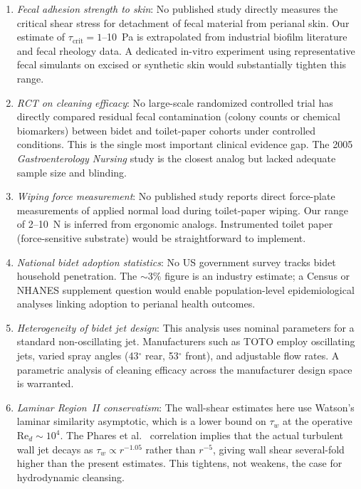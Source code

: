\documentclass[10pt,letterpaper]{article}
\newcommand{\Rey}{\mathrm{Re}}
\begin{document}
\begin{enumerate}[leftmargin=*, label=(\roman*)]
    \item \emph{Fecal adhesion strength to skin}: No published study directly
    measures the critical shear stress for detachment of fecal material from
    perianal skin. Our estimate of $\tau_\mathrm{crit} = 1$--10~Pa is
    extrapolated from industrial biofilm literature and fecal rheology data.
    A dedicated in-vitro experiment using representative fecal simulants on
    excised or synthetic skin would substantially tighten this range.
    \item \emph{RCT on cleaning efficacy}: No large-scale randomized
    controlled trial has directly compared residual fecal contamination
    (colony counts or chemical biomarkers) between bidet and toilet-paper
    cohorts under controlled conditions. This is the single most important
    clinical evidence gap. The 2005 \textit{Gastroenterology Nursing} study
    is the closest analog but lacked adequate sample size and blinding.
    \item \emph{Wiping force measurement}: No published study reports direct
    force-plate measurements of applied normal load during toilet-paper wiping.
    Our range of 2--10~N is inferred from ergonomic analogs. Instrumented
    toilet paper (force-sensitive substrate) would be straightforward to
    implement.
    \item \emph{National bidet adoption statistics}: No US government survey
    tracks bidet household penetration. The $\sim3\%$ figure is an industry
    estimate; a Census or NHANES supplement question would enable population-level
    epidemiological analyses linking adoption to perianal health outcomes.
    \item \emph{Heterogeneity of bidet jet design}: This analysis uses
    nominal parameters for a standard non-oscillating jet. Manufacturers
    such as TOTO employ oscillating jets, varied spray angles (43$^\circ$ rear,
    53$^\circ$ front), and adjustable flow rates. A parametric analysis of
    cleaning efficacy across the manufacturer design space is warranted.
    \item \emph{Laminar Region~II conservatism}: The wall-shear
    estimates here use Watson's laminar similarity asymptotic, which
    is a lower bound on $\tau_w$ at the operative
    $\Rey_d \sim 10^4$. The Phares et al.~\citep{Phares2000}
    correlation implies that the actual turbulent wall jet decays as
    $\tau_w \propto r^{-1.05}$ rather than $r^{-5}$, giving wall
    shear several-fold higher than the present estimates. This
    tightens, not weakens, the case for hydrodynamic cleansing.
\end{enumerate}
\end{document}
